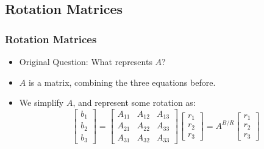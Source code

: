 \documentclass[11pt]{beamer}
\begin{document}
    \subsection{Rotation Matrices}\label{subsec:rotationMatrices}
    \begin{frame}
        \frametitle{Rotation Matrices}
        \begin{itemize}[<+->]
            \item Original Question: What represents $A$? \medskip
            \item $A$ is a matrix, combining the three equations before. \medskip
            \item We simplify $A$, and represent some rotation as: \medskip
            \begin{equation}
                \begin{bmatrix}
                    b_1 \\
                    b_2 \\
                    b_3
                \end{bmatrix}
                =
                \begin{bmatrix}
                    A_{11} & A_{12} & A_{13} \\
                    A_{21} & A_{22} & A_{33} \\
                    A_{31} & A_{32} & A_{33}
                \end{bmatrix}
                \begin{bmatrix}
                    r_1 \\
                    r_2 \\
                    r_3
                \end{bmatrix}
                = A^{B/R}
                \begin{bmatrix}
                    r_1 \\
                    r_2 \\
                    r_3
                \end{bmatrix}
            \end{equation} \medskip
        \end{itemize}
    \end{frame}
\end{document}
